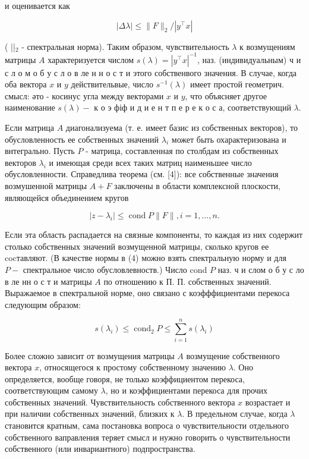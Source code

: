 \documentclass[10pt]{article}
\begin{document}
и оценивается как



\[

|\Delta \lambda| \leqslant\|F\|_{2} /\left|y^{\top} x\right|

\]



( ||$_{2}$ - спектральная норма). Таким образом, чувствительность $\lambda$ к возмущениям матрицы $A$ характеризуется числом $s(\lambda)=\left|y^{\top} x\right|^{-1}$, наз. (индивидуальным) ч и с л о м о б у с л о в ле н н о с т и этого собственвого значения. В случае, когда оба вектора $x$ и $y$ действительвые, число $s^{-1}(\lambda)$ имеет простой геометрич. смысл: әто - косинус угла между векторами $x$ и $y$, что объясняет другое наименование $s(\lambda)-$ к о э фіф и д и е н т п е р е к о с а, соответствующий $\lambda$.



Если матрица $A$ диагонализуема (т. е. имеет базис из собственных векторов), то обусловленность ее собственных значений $\lambda_{i}$ может быть охарактеризована и внтегрально. Пусть $P$ - матрица, составленная по столбдам из собственных векторов $\lambda_{i}$ и имеющая среди всех таких матриц наименьшее число обусловленности. Справедлива теорема (см. [4]): все собственные значения возмушенной матрицы $A+F$ заключены в области комплексной плоскости, являющейся объединением кругов



\[

\left|z-\lambda_{i}\right| \leqslant \operatorname{cond} P\|F\|, i=1, \ldots, n .

\]



Если эта область распадается на связные компоненты, то каждая из них содержит столько собственных значений возмущенной матрицы, сколько кругов ее cocтавляют. (В качестве нормы в (4) можно взять спектральную норму и для $P-$ спектральное число обусловлевноств.) Число cond $P$ наз. ч и слом о б у с ло в ле нн о с т и матрицы $A$ по отношению к П. П. собственных значений. Выражаемое в спектральной норме, оно связано с коэфффициентами перекоса следующим образом:



\[

s\left(\lambda_{i}\right) \leqslant \operatorname{cond}_{2} P \leqslant \sum_{i=1}^{n} s\left(\lambda_{i}\right)

\]



Более сложно зависит от возмущения матрицы $A$ возмущение собственного вектора $x$, относящегося к простому собственному значению $\lambda$. Оно определяется, вообще говоря, не только коэффициентом перекоса, соответствующим самому $\lambda$, но и коэффициентами перекоса для прочих собственных значений. Чувствительность собственного вектора $x$ возрастает и при наличии собственных значений, близких к $\lambda$. В предельном случае, когда $\lambda$ становится кратным, сама постановка вопроса о чувствительности отдельного собственного ваправления теряет смысл и нужно говорить о чувствительности собственного (или инвариантного) подпространства.
\end{document}
